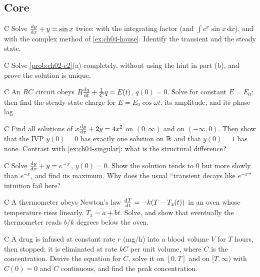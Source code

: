 \subsection*{Core}

\begin{problem}{C}\label{prob:ch04-c1}
Solve $\frac{\mathrm{d}y}{\mathrm{d}x} + y = \sin x$ twice: with the integrating factor (and
$\int e^x\sin x\,\mathrm{d}x$), and with the complex method of
\cref{ex:ch04-house}. Identify the transient and the steady state.
\end{problem}

\begin{problem}{C}\label{prob:ch04-c2}
Solve \cref{prob:ch02-c2}(a) completely, without using the hint in part (b),
and prove the solution is unique.
\end{problem}

\begin{problem}{C}\label{prob:ch04-c3}
An $RC$ circuit obeys $R\frac{\mathrm{d}q}{\mathrm{d}t} + \frac1C q = E(t)$, $q(0) = 0$. Solve for
constant $E = E_0$; then find the steady-state charge for $E = E_0\cos\omega t$,
its amplitude, and its phase lag.
\end{problem}

\begin{problem}{C}\label{prob:ch04-c4}
Find all solutions of $x\frac{\mathrm{d}y}{\mathrm{d}x} + 2y = 4x^2$ on $(0,\infty)$ and on
$(-\infty,0)$. Then show that the IVP $y(0) = 0$ has exactly one solution on
$\mathbb{R}$ and that $y(0) = 1$ has none. Contrast with \cref{ex:ch04-singular}: what
is the structural difference?
\end{problem}

\begin{problem}{C}\label{prob:ch04-c5}
Solve $\frac{\mathrm{d}y}{\mathrm{d}x} + y = e^{-x}$, $y(0) = 0$. Show the solution tends to $0$ but
more slowly than $e^{-x}$, and find its maximum. Why does the usual
``transient decays like $e^{-x}$'' intuition fail here?
\end{problem}

\begin{problem}{C}\label{prob:ch04-c6}
A thermometer obeys Newton's law $\frac{\mathrm{d}T}{\mathrm{d}t} = -k(T - T_{\mathrm a}(t))$ in an oven
whose temperature rises linearly, $T_{\mathrm a} = a + bt$. Solve, and show that
eventually the thermometer reads $b/k$ degrees below the oven.
\end{problem}

\begin{problem}{C}\label{prob:ch04-c7}
A drug is infused at constant rate $r$ (mg/h) into a blood volume $V$ for $T$
hours, then stopped; it is eliminated at rate $kC$ per unit volume, where $C$
is the concentration. Derive the equation for $C$, solve it on $[0,T]$ and on
$[T,\infty)$ with $C(0) = 0$ and $C$ continuous, and find the peak
concentration.
\end{problem}

